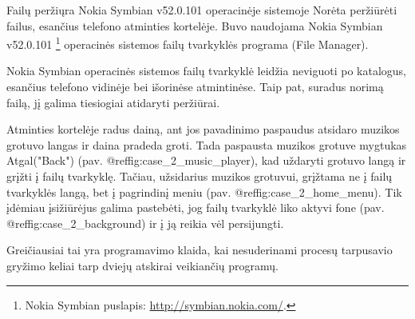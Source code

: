 \begin{xcase}{Failų peržiųra Nokia Symbian v52.0.101 operacinėje sistemoje}
  \xcgoal
  {
  	Norėta peržiūrėti failus, esančius telefono atminties kortelėje. 
	Buvo naudojama Nokia Symbian v52.0.101 \footnote{Nokia Symbian puslapis: \url{http://symbian.nokia.com/}.} 
	operacinės sistemos failų tvarkyklės programa (File Manager). 
  }
  
  \xctools
  {
    Nokia Symbian operacinės sistemos failų tvarkyklė leidžia neviguoti po
	katalogus, esančius telefono vidinėje bei išorinėse atmintinėse. Taip 
	pat, suradus norimą failą, jį galima tiesiogiai atidaryti peržiūrai.
  }
  
  \xcresult
  {
    Atminties kortelėje radus dainą, ant jos pavadinimo paspaudus atsidaro muzikos
	grotuvo langas ir daina pradeda groti. Tada paspausta muzikos grotuve mygtukas 
	Atgal("Back") (pav. @ref{fig:case_2_music_player}), kad uždaryti grotuvo langą 
	ir grįžti į failų tvarkyklę. Tačiau, užsidarius muzikos grotuvui, grįžtama ne į
	failų tvarkyklės langą, bet į pagrindinį meniu (pav. @ref{fig:case_2_home_menu}). 
	Tik įdėmiau įsižiūrėjus galima pastebėti, jog failų tvarkyklė liko aktyvi fone 
	(pav. @ref{fig:case_2_background}) ir į ją reikia vėl persijungti.
	
    {
    }
  }
  
  \xcprinciples
  {
  }
  
  \xcthoughts
  {
    Greičiausiai tai yra programavimo klaida, kai nesuderinami procesų tarpusavio gryžimo keliai
	tarp dviejų atskirai veikiančių programų.
  }
\end{xcase}
